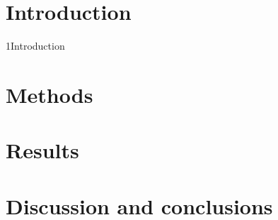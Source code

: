 \documentclass{../Misc/format}
\begin{document}



\tableofcontents

\chapter{Introduction}
{1Introduction}

\chapter{Methods}

\chapter{Results}

\chapter{Discussion and conclusions}


\printbibliography
\end{document}
